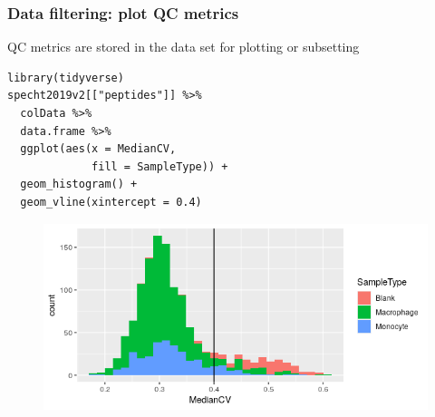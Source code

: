 \documentclass{beamer}
\newcommand{\frametitlesection}[1]{\frametitle{\centering #1 \footnotesize \hspace{0pt plus 1 filll} \insertsection}}
\begin{document}
\begin{frame}[fragile]
    \frametitlesection{Data filtering: plot QC metrics}

    QC metrics are stored in the data set for plotting or subsetting
    
    \begin{lstlisting}[basicstyle = \scriptsize\ttfamily\color{vdgray}]
library(tidyverse)
specht2019v2[["peptides"]] %>%
  colData %>%
  data.frame %>%
  ggplot(aes(x = MedianCV, 
             fill = SampleType)) +
  geom_histogram() +
  geom_vline(xintercept = 0.4)
    \end{lstlisting}
    
    \begin{figure}
        \centering
        \includegraphics[width=.7\linewidth]{figs/medianCV.png}
    \end{figure}
\end{frame}
\end{document}
